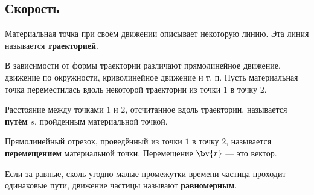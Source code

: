 \zerocounter
\subsection{Скорость}

\begin{definition}
    Материальная точка при своём движении описывает некоторую линию. Эта линия называется \textbf{траекторией}. 
\end{definition}
В зависимости от формы траектории различают прямолинейное движение, движение по окружности, криволинейное движение и т. п.
\newpage
\noindent Пусть материальная точка переместилась вдоль некоторой траектории из точки $1$ в точку $2$.\\
\begin{definition}
    Расстояние между точками $1$ и $2$, отсчитанное вдоль траектории, называется \textbf{путём} $s$, пройденным материальной точкой.
\end{definition}
\begin{definition}
    Прямолинейный отрезок, проведённый из точки $1$ в точку $2$, называется \textbf{перемещением} материальной точки. Перемещение $\bv{r}$ --- это вектор.
\end{definition}

\begin{definition}
    Если за равные, сколь угодно малые промежутки времени частица проходит одинаковые пути, движение частицы называют \textbf{равномерным}.
\end{definition}

